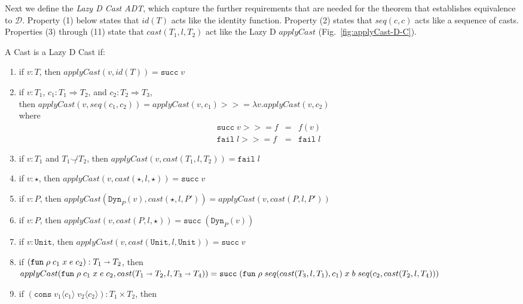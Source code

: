\documentclass[acmsmall,review,anonymous]{acmart}\settopmatter{printfolios=true,printccs=false,printacmref=false}
\newcommand{\judgeType}[2]{#1 : #2}
\newcommand{\judgeTypeFT}[3]{#1 : #2 \Longrightarrow #3} %
\newcommand{\TOOdyn}[0]{\star}
\newcommand{\POOunit}[0]{\mathtt{Unit}}
\newcommand{\POOfun}[2]{#1 \shortrightarrow #2}
\newcommand{\POOprod}[2]{#1 \times #2}
\newcommand{\rOOsucc}[1]{\mathtt{succ}\;#1}
\newcommand{\rOOfail}[1]{\mathtt{fail}\;#1}
\newcommand{\hcvOOinj}[2]{\mathtt{Dyn}_{#1}(#2)}
\newcommand{\hcvOOfun}[5]{\mathtt{fun} \; #2 \; #1 \; #3 \; #4 \; #5}
\newcommand{\hcvOOcons}[4]{\mathtt{cons}\;#1\langle#2\rangle\;#3\langle#4\rangle}
\newcommand{\ineffCEKD}{$\mathcal{D}$}
\begin{document}
Next we define the \emph{Lazy D Cast ADT}, which capture the further
requirements that are needed for the theorem that establishes
equivalence to \ineffCEKD{}. Property (1) below states that $id(T)$
acts like the identity function. Property (2) states that $seq(c,c)$
acts like a sequence of casts. Properties (3) through (11) state that
$cast(T_1,l,T_2)$ act like the Lazy D $applyCast$
(Fig.~\ref{fig:applyCast-D-C}).

\begin{definition}
  \label{def:surely-lazyd}
  A  Cast is a Lazy D Cast if:
  \begin{enumerate}
  \item if $v : T$, then $applyCast(v,id(T)) = \mathtt{succ} \; v $
  \item if $\judgeType{v}{T_1}$,
    $ \judgeTypeFT{c_1}{T_1}{T_2}$, and
    $ \judgeTypeFT{c_2}{T_2}{T_3}$,\\
    then $applyCast(v,seq(c_1,c_2)) = 
    applyCast(v,c_1) >>= \lambda v.applyCast(v,c_2)$\\
    where 
    \[
    \begin{array}{rcl}
      \rOOsucc{v} >>= f & = & f(v) \\
      \rOOfail{l} >>= f & = & \rOOfail{l}
    \end{array}
    \]
  \item if $v : T_1$ and $T_1 \not\smile T_2$,
    then $applyCast(v,cast(T_1, l, T_2)) = \rOOfail{l} $
  \item if $v : \star$, 
    then $applyCast(v,cast(\TOOdyn,l,\TOOdyn)) = \rOOsucc{v} $
  \item if $v : P$,
    then $applyCast(\hcvOOinj{P}{v},cast(\star,l,P')) 
    = applyCast(v,cast(P,l,P')) $
  \item if $v : P$,
    then $applyCast(v,cast(P,l,\star)) = \rOOsucc{(\hcvOOinj{P}{v})} $
  \item if $v : \POOunit$,
    then $applyCast(v,cast(\POOunit,l,\POOunit)) = \rOOsucc{v} $
  \item if $(\hcvOOfun{c_1}{\rho}{x}{e}{c_2}) : \POOfun{T_1}{T_2}$,
    then\\
    $ 
    applyCast(\hcvOOfun{c_1}{\rho}{x}{e}{c_2}, 
    cast(\POOfun{T_1}{T_2},l,\POOfun{T_3}{T_4})) \\
    = 
    \rOOsucc{(\hcvOOfun{seq(cast(T_3,l,T_1),c_1)}{\rho}{x}{b}{seq(c_2,cast(T_2,l,T_4))})}$
  \item if $(\hcvOOcons{v_1}{c_1}{v_2}{c_2}) : \POOprod{T_1}{T_2}$,
    then \\

\end{enumerate}
\end{definition}
\end{document}
